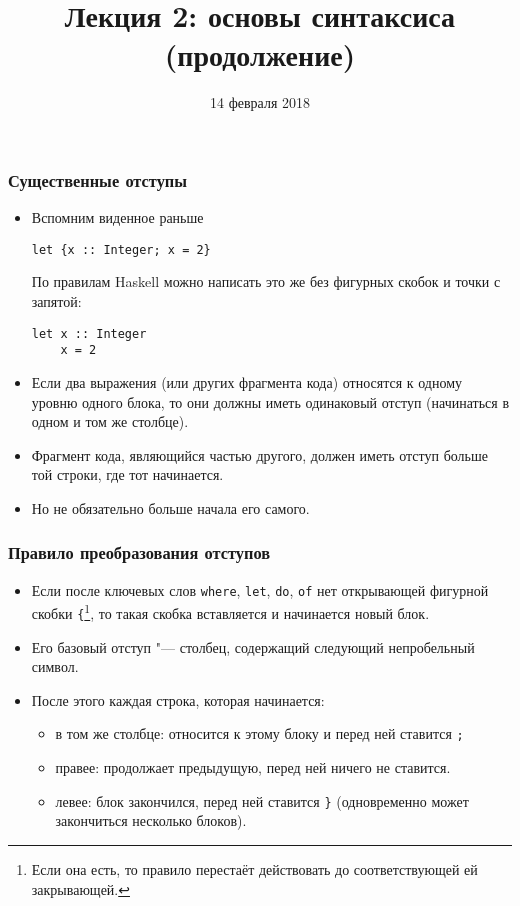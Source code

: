 \documentclass[10pt]{beamer}
\title{Лекция 2: основы синтаксиса (продолжение)}
\date{14 февраля 2018}
\begin{document}
\begin{frame}[plain]
\maketitle
\end{frame}

\begin{frame}[fragile]
\frametitle{Существенные отступы}
\begin{itemize}
    \item Вспомним виденное раньше
\begin{lstlisting}
let {x :: Integer; x = 2}
\end{lstlisting}
По правилам Haskell можно написать это же без фигурных скобок и точки с запятой:
\begin{lstlisting}
let x :: Integer
    x = 2
\end{lstlisting}
\item Если два выражения (или других фрагмента кода) относятся к одному уровню одного блока, то они должны иметь одинаковый отступ (начинаться в одном и том же столбце).
\item Фрагмент кода, являющийся частью другого, должен иметь отступ больше той строки, где тот начинается.
\item Но не обязательно больше начала его самого.
\end{itemize}
\end{frame}
\begin{frame}[fragile]
\frametitle{Правило преобразования отступов}
\begin{itemize}
\item Если после ключевых слов \lstinline|where|, \lstinline|let|, \lstinline|do|, \lstinline|of| нет открывающей фигурной скобки \lstinline|{|\footnote{Если она есть, то правило перестаёт действовать до соответствующей ей закрывающей.}, то такая скобка вставляется и начинается новый блок.
\item Его базовый отступ "--- столбец, содержащий следующий непробельный символ.
\item После этого каждая строка, которая начинается:
\begin{itemize}
    \item в том же столбце: относится к этому блоку и перед ней ставится \lstinline|;|
    \item правее: продолжает предыдущую, перед ней ничего не ставится.
    \item левее: блок закончился, перед ней ставится \lstinline|}| (одновременно может закончиться несколько блоков).
\end{itemize}
\end{itemize}
\end{frame}
\end{document}
